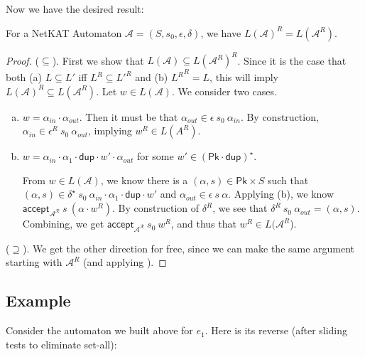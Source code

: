 \documentclass[acmsmall,dvipsnames,nonacm]{acmart}
\newcommand\Pk{\mathsf{Pk}}
\newcommand\pk{\alpha}
\newcommand\dup{\mathsf{dup}}
\newcommand\ddd{\cdot\dup\cdot}
\newcommand\accept{\mathsf{accept}}
\newcommand\NetKAT{\textsf{NetKAT}\xspace}
\begin{document}
Now we have the desired result:
\begin{theorem}
    For a \NetKAT Automaton $\mathcal{A} = (S, s_0, \epsilon, \delta)$, we have
    $L(\mathcal{A})^R = L(\mathcal{A}^R)$.
\end{theorem}
\begin{proof}
    ($\subseteq$). First we show that $L(\mathcal{A}) \subseteq L(\mathcal{A}^R)^R$. Since it is
    the case that both (a) $L \subseteq L'$ iff $L^R \subseteq L'^R$ and (b)
    ${L^R}^R = L$, this will imply $L(\mathcal{A})^R \subseteq L(\mathcal{A}^R)$.
    Let $w \in L(\mathcal{A})$. We consider two cases.
    \begin{enumerate}[(a)]
        \item $w = \pk_{in}\cdot \pk_{out}$. Then it must be that $\pk_{out}\in\epsilon\ s_0\
        \pk_{in}$. By construction, $\pk_{in}\in\epsilon^R\ s_0\ \pk_{out}$, implying
        $w^R \in L(A^R)$.
        \item $w = \pk_{in}\cdot \pk_1\ddd w'\cdot \pk_{out}$ for some $w'\in(\Pk\cdot\dup)^\star$.

           From $w\in L(\mathcal{A})$, we know there is a $(\pk,s)\in \Pk\times S$ such
           that $(\pk, s)\in \delta^\star\ s_0\ \pk_{in}\cdot \pk_1\ddd w'$ and
           $\pk_{out}\in \epsilon\ s\ \pk$. Applying \Cref{lem:paths-reverse}(b), we
           know $\accept_{\mathcal{A^R}}\ s\ (\pk\cdot w^R)$. By
           construction of $\delta^R$, we see that $\delta^R\ s_0\ \pk_{out} =
           (\pk, s)$.
           Combining, we get $\accept_{\mathcal{A^R}}\ s_0\ w^R$, and
           thus that $w^R \in L(\mathcal{A}^R$).

    \end{enumerate}
    ($\supseteq$). We get the other direction for free, since we can make the same
    argument starting with $\mathcal{A}^R$ (and applying \Cref{lem:rev-rev-id}).
\end{proof}

\subsection{Example}

Consider the automaton we built above for $e_1$. Here is its reverse (after
sliding tests to eliminate set-all):
\begin{center}
\end{center}
\end{document}
